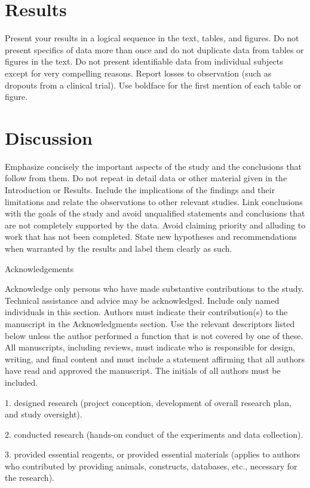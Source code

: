 \documentclass[conference]{IEEEtran}
\begin{document}
\section*{\textbf{Results}}

Present your results in a logical sequence in the text, tables, and figures. Do not present specifics of data more than once and do not duplicate data from tables or figures in the text. Do not present identifiable data from individual subjects except for very compelling reasons. Report losses to observation (such as dropouts from a clinical trial). Use boldface for the first mention of each table or figure.

\section*{\textbf{Discussion}}

Emphasize concisely the important aspects of the study and the conclusions that follow from them. Do not repeat in detail data or other material given in the Introduction or Results. Include the implications of the findings and their limitations and relate the observations to other relevant studies. Link conclusions with the goals of the study and avoid unqualified statements and conclusions that are not completely supported by the data. Avoid claiming priority and alluding to work that has not been completed. State new hypotheses and recommendations when warranted by the results and label them clearly as such.

Acknowledgements  

Acknowledge only persons who have made substantive contributions to the study. Technical assistance and advice may be acknowledged. Include only named individuals in this section. Authors must indicate their contribution(s) to the manuscript in the Acknowledgments section. Use the relevant descriptors listed below unless the author performed a function that is not covered by one of these. All manuscripts, including reviews, must indicate who is responsible for design, writing, and final content and must include a statement affirming that all authors have read and approved the manuscript. The initials of all authors must be included. 

1.    designed research (project conception, development of overall research plan, and study oversight). 

2.    conducted research (hands-on conduct of the experiments and data collection). 

3.    provided essential reagents, or provided essential materials (applies to authors who contributed by providing animals, constructs, databases, etc., necessary for the research). 
\end{document}
